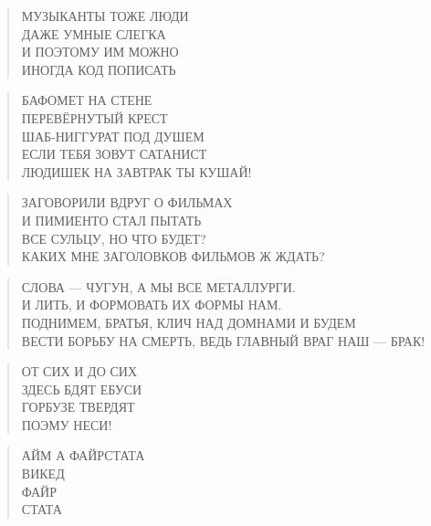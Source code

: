 \poemtitle{***}
\begin{verse}
МУЗЫКАНТЫ ТОЖЕ ЛЮДИ\\
ДАЖЕ УМНЫЕ СЛЕГКА\\
И ПОЭТОМУ ИМ МОЖНО\\
ИНОГДА КОД ПОПИСАТЬ
\end{verse}

\poemtitle{***}
\begin{verse}
БАФОМЕТ НА СТЕНЕ\\
ПЕРЕВЁРНУТЫЙ КРЕСТ\\
ШАБ-НИГГУРАТ ПОД ДУШЕМ\\
ЕСЛИ ТЕБЯ ЗОВУТ САТАНИСТ\\
ЛЮДИШЕК НА ЗАВТРАК ТЫ КУШАЙ!
\end{verse}

\poemtitle{***}
\begin{verse}
ЗАГОВОРИЛИ ВДРУГ О ФИЛЬМАХ\\
И ПИМИЕНТО СТАЛ ПЫТАТЬ\\
ВСЕ СУЛЬЦУ, НО ЧТО БУДЕТ?\\
КАКИХ МНЕ ЗАГОЛОВКОВ ФИЛЬМОВ Ж ЖДАТЬ?
\end{verse}

\poemtitle{***}
\begin{verse}
СЛОВА — ЧУГУН, А МЫ ВСЕ МЕТАЛЛУРГИ.\\
И ЛИТЬ, И ФОРМОВАТЬ ИХ ФОРМЫ НАМ.\\
ПОДНИМЕМ, БРАТЬЯ, КЛИЧ НАД ДОМНАМИ И БУДЕМ\\
ВЕСТИ БОРЬБУ НА СМЕРТЬ, ВЕДЬ ГЛАВНЫЙ ВРАГ НАШ — БРАК!
\end{verse}

\poemtitle{***}
\begin{verse}
ОТ СИХ И ДО СИХ\\
ЗДЕСЬ БДЯТ ЕБУСИ\\
ГОРБУЗЕ ТВЕРДЯТ\\
ПОЭМУ НЕСИ!
\end{verse}

\poemtitle{***}
\begin{verse}
АЙМ А ФАЙРСТАТА\\
ВИКЕД\\
      ФАЙР\\
           СТАТА
\end{verse}

